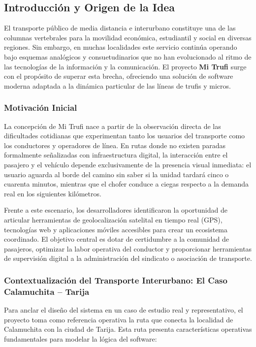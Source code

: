 \subsection{Introducción y Origen de la Idea}

El transporte público de media distancia e interurbano constituye una de las columnas vertebrales para la movilidad económica, estudiantil y social en diversas regiones. Sin embargo, en muchas localidades este servicio continúa operando bajo esquemas analógicos y consuetudinarios que no han evolucionado al ritmo de las tecnologías de la información y la comunicación. El proyecto \textbf{Mi Trufi} surge con el propósito de superar esta brecha, ofreciendo una solución de software moderna adaptada a la dinámica particular de las líneas de trufis y micros.

\subsubsection{Motivación Inicial}

La concepción de Mi Trufi nace a partir de la observación directa de las dificultades cotidianas que experimentan tanto los usuarios del transporte como los conductores y operadores de línea. En rutas donde no existen paradas formalmente señalizadas con infraestructura digital, la interacción entre el pasajero y el vehículo depende exclusivamente de la presencia visual inmediata: el usuario aguarda al borde del camino sin saber si la unidad tardará cinco o cuarenta minutos, mientras que el chofer conduce a ciegas respecto a la demanda real en los siguientes kilómetros.

Frente a este escenario, los desarrolladores identificaron la oportunidad de articular herramientas de geolocalización satelital en tiempo real (GPS), tecnologías web y aplicaciones móviles accesibles para crear un ecosistema coordinado. El objetivo central es dotar de certidumbre a la comunidad de pasajeros, optimizar la labor operativa del conductor y proporcionar herramientas de supervisión digital a la administración del sindicato o asociación de transporte.

\subsubsection{Contextualización del Transporte Interurbano: El Caso Calamuchita -- Tarija}

Para anclar el diseño del sistema en un caso de estudio real y representativo, el proyecto toma como referencia operativa la ruta que conecta la localidad de Calamuchita con la ciudad de Tarija. Esta ruta presenta características operativas fundamentales para modelar la lógica del software:

